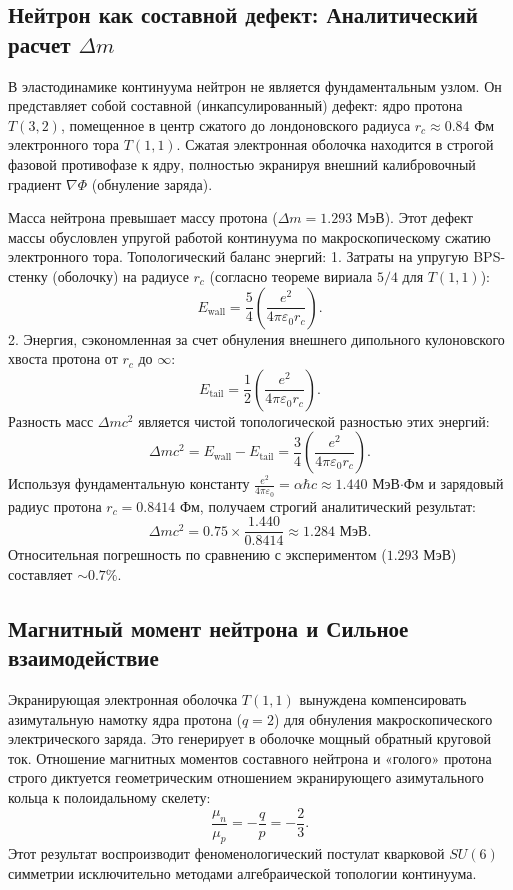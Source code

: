 \documentclass[12pt,a4paper]{article}
\begin{document}
\subsection{Нейтрон как составной дефект: Аналитический расчет $\Delta m$}
В эластодинамике континуума нейтрон не является фундаментальным узлом. Он представляет собой составной (инкапсулированный) дефект: ядро протона $T(3,2)$, помещенное в центр сжатого до лондоновского радиуса $r_c \approx 0.84$ Фм электронного тора $T(1,1)$. Сжатая электронная оболочка находится в строгой фазовой противофазе к ядру, полностью экранируя внешний калибровочный градиент $\nabla \Phi$ (обнуление заряда).

Масса нейтрона превышает массу протона ($\Delta m = 1.293$ МэВ). Этот дефект массы обусловлен упругой работой континуума по макроскопическому сжатию электронного тора. Топологический баланс энергий:
1. Затраты на упругую BPS-стенку (оболочку) на радиусе $r_c$ (согласно теореме вириала $5/4$ для $T(1,1)$):
\begin{equation}
E_{\text{wall}} = \frac{5}{4} \left( \frac{e^2}{4\pi\varepsilon_0 r_c} \right).
\end{equation}
2. Энергия, сэкономленная за счет обнуления внешнего дипольного кулоновского хвоста протона от $r_c$ до $\infty$:
\begin{equation}
E_{\text{tail}} = \frac{1}{2} \left( \frac{e^2}{4\pi\varepsilon_0 r_c} \right).
\end{equation}
Разность масс $\Delta m c^2$ является чистой топологической разностью этих энергий:
\begin{equation}
\Delta m c^2 = E_{\text{wall}} - E_{\text{tail}} = \frac{3}{4} \left( \frac{e^2}{4\pi\varepsilon_0 r_c} \right).
\end{equation}
Используя фундаментальную константу $\frac{e^2}{4\pi\varepsilon_0} = \alpha \hbar c \approx 1.440$ МэВ$\cdot$Фм и зарядовый радиус протона $r_c = 0.8414$ Фм, получаем строгий аналитический результат:
\begin{equation}
\Delta m c^2 = 0.75 \times \frac{1.440}{0.8414} \approx 1.284 \text{ МэВ}.
\end{equation}
Относительная погрешность по сравнению с экспериментом ($1.293$ МэВ) составляет $\sim 0.7\%$.

\subsection{Магнитный момент нейтрона и Сильное взаимодействие}
Экранирующая электронная оболочка $T(1,1)$ вынуждена компенсировать азимутальную намотку ядра протона ($q=2$) для обнуления макроскопического электрического заряда. Это генерирует в оболочке мощный обратный круговой ток. Отношение магнитных моментов составного нейтрона и «голого» протона строго диктуется геометрическим отношением экранирующего азимутального кольца к полоидальному скелету:
\begin{equation}
\frac{\mu_n}{\mu_p} = -\frac{q}{p} = -\frac{2}{3}.
\end{equation}
Этот результат воспроизводит феноменологический постулат кварковой $SU(6)$ симметрии исключительно методами алгебраической топологии континуума.
\end{document}
